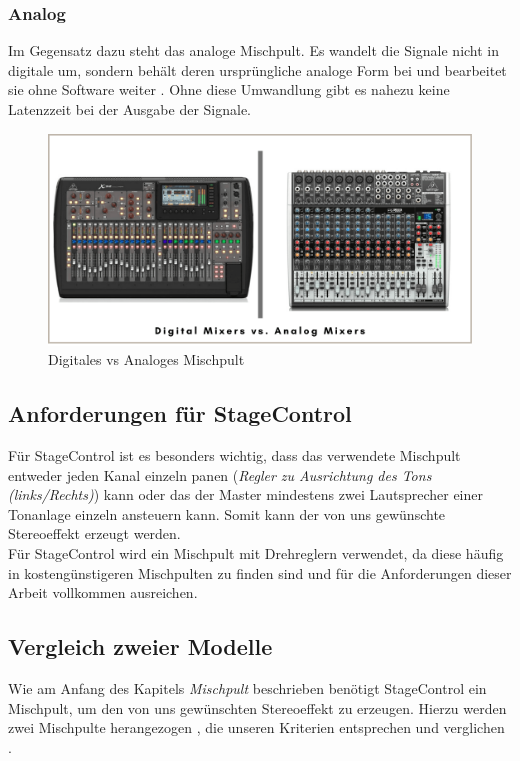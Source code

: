 \subsubsection{Analog}
Im Gegensatz dazu steht das analoge Mischpult. Es wandelt die Signale nicht in digitale um, sondern behält deren ursprüngliche analoge Form bei und bearbeitet sie ohne Software weiter \parencite{MischpultAnalogDigital}. Ohne diese Umwandlung gibt es nahezu keine Latenzzeit bei der Ausgabe der Signale. \\


\begin{figure}[H]
	\centering
	\includegraphics[width=0.8\linewidth]{images/DigitalMixerAnalogMixer.png}
	\caption[Digitales vs Analoges Mischpult]{Digitales vs Analoges Mischpult}
	\label{fig:Digitales vs. Analoges Mischpult}
\end{figure}


\subsection{Anforderungen für StageControl}
Für StageControl ist es besonders wichtig, dass das verwendete Mischpult entweder jeden Kanal einzeln panen (\textit{Regler zu Ausrichtung des Tons (links/Rechts)}) kann oder das der Master mindestens zwei Lautsprecher einer Tonanlage einzeln ansteuern kann. Somit kann der von uns gewünschte Stereoeffekt erzeugt werden. \\
Für StageControl wird ein Mischpult mit Drehreglern verwendet, da diese häufig in kostengünstigeren Mischpulten zu finden sind und für die Anforderungen dieser Arbeit vollkommen ausreichen. 



\subsection{Vergleich zweier Modelle}
Wie am Anfang des Kapitels \textit{Mischpult} beschrieben benötigt StageControl ein Mischpult, um den von uns gewünschten Stereoeffekt zu erzeugen. Hierzu werden zwei Mischpulte herangezogen \parencite{MischpultKriterien1204}, die unseren Kriterien entsprechen und  verglichen  \parencite{MischpultKriterien1402}.

